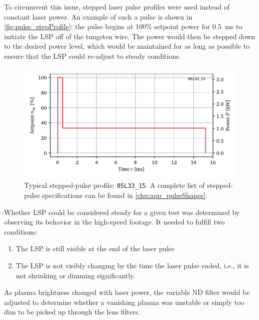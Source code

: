             To circumvent this issue, stepped laser pulse profiles were used instead of constant laser power. An example of such a pulse is shown in \autoref{fig:pulse_stepProfile}: the pulse begins at 100\% setpoint power for \qty{0.5}{ms} to initiate the LSP off of the tungsten wire. The power would then be stepped down to the desired power level, which would be maintained for as long as possible to ensure that the LSP could re-adjust to steady conditions.

            \begin{figure}[h]
                \centering
                \includegraphics[]{assets/5 results/pulse_profile}
                \caption[Typical stepped-pulse profile: \texttt{05L33\_15}]{Typical stepped-pulse profile: \texttt{05L33\_15}. A complete list of stepped-pulse specifications can be found in \autoref{chp:app_pulseShapes}.}
                \label{fig:pulse_stepProfile}
            \end{figure}

            Whether LSP could be considered steady for a given test was determined by observing its behavior in the high-speed footage. It needed to fulfill two conditions:
            \begin{enumerate}
                \item The LSP is still visible at the end of the laser pulse
                \item The LSP is not visibly changing by the time the laser pulse ended, i.e., it is not shrinking or dimming significantly.
            \end{enumerate}
            As plasma brightness changed with laser power, the variable ND filter would be adjusted to determine whether a vanishing plasma was unstable or simply too dim to be picked up through the lens filters.



